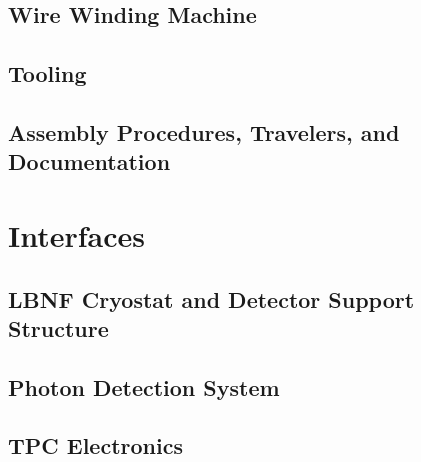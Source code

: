 \subsection{Wire Winding Machine}
\label{sec:fdsp-apa-winding}


\subsection{Tooling}
\label{sec:fdsp-apa-tooling}


\subsection{Assembly Procedures, Travelers, and Documentation}
\label{sec:fdsp-apa-assy}




\section{Interfaces}
\label{sec:fdsp-apa-intfc}

 



\subsection{LBNF Cryostat and Detector Support Structure}
\label{sec:fdsp-apa-intfc-lbnf-dss}


\subsection{Photon Detection System}
\label{sec:fdsp-apa-intfc-pds}


\subsection{TPC Electronics}
\label{sec:fdsp-apa-intfc-elec}




